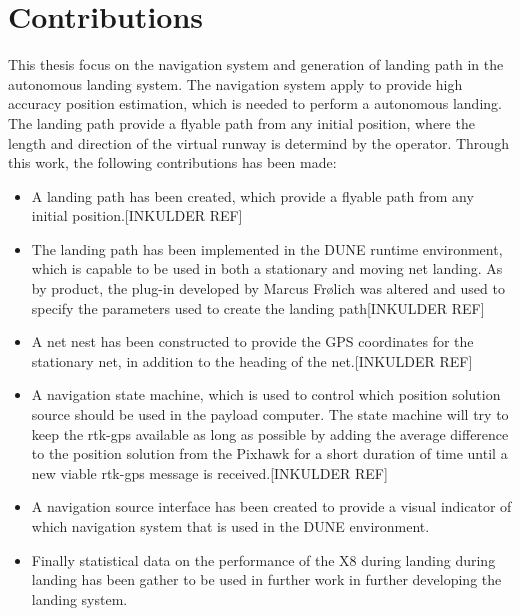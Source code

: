 \section{Contributions}
This thesis focus on the navigation system and generation of landing path in the autonomous landing system. The navigation system apply  to provide high accuracy position estimation, which is needed to perform a autonomous landing. The landing path provide a flyable path from any initial position, where the length and direction of the virtual runway is determind by the operator. Through this work, the following contributions has been made:
\begin{itemize}
\item A landing path has been created, which provide a flyable path from any initial position.[INKULDER REF]
\item The landing path has been implemented in the DUNE runtime environment, which is capable to be used in both a stationary and moving net landing. As by product, the plug-in developed by Marcus Frølich \citep{Froelich} was altered and used to specify the parameters used to create the landing path[INKULDER REF]
\item A net nest has been constructed to provide the GPS coordinates for the stationary net, in addition to the heading of the net.[INKULDER REF]
\item A navigation state machine, which is used to control which position solution source should be used in the payload computer. The state machine will try to keep the \gls{rtk-gps} available as long as possible by adding the average difference to the position solution from the Pixhawk for a short duration of time until a new viable \gls{rtk-gps} message is received.[INKULDER REF]
\item  A navigation source interface has been created to provide a visual indicator of which navigation system that is used in the DUNE environment.
\item Finally statistical data on the performance of the X8 during landing during landing has been gather to be used in further work in further developing the landing system.
\end{itemize}
\cleardoublepage